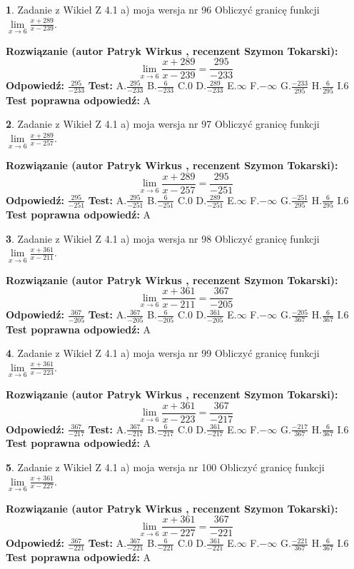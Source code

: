 \documentclass[12pt, a4paper]{article}
\theoremstyle{definition} %
\newtheorem{zad}{}
\newcommand{\zadStart}[1]{\begin{zad}#1\newline}
\newcommand{\zadStop}{\end{zad}}
\newcommand{\rozwStart}[2]{\noindent \textbf{Rozwiązanie (autor #1 , recenzent #2): }\newline}
\newcommand{\rozwStop}{\newline}
\newcommand{\odpStart}{\noindent \textbf{Odpowiedź:}\newline}
\newcommand{\odpStop}{\newline}
\newcommand{\testStart}{\noindent \textbf{Test:}\newline}
\newcommand{\testStop}{\newline}
\newcommand{\kluczStart}{\noindent \textbf{Test poprawna odpowiedź:}\newline}
\newcommand{\kluczStop}{\newline}
\begin{document}
\zadStart{Zadanie z Wikieł Z 4.1 a) moja wersja nr 96}
Obliczyć granicę funkcji $\lim\limits_{x\to6}\frac{x+289}{x-239}$.
\zadStop
\rozwStart{Patryk Wirkus}{Szymon Tokarski}
$$\lim\limits_{x\to6}\frac{x+289}{x-239} = \frac{295}{-233}$$
\rozwStop
\odpStart
$\frac{295}{-233}$
\odpStop
\testStart
A.$\frac{295}{-233}$
B.$\frac{6}{-233}$
C.$0$
D.$\frac{289}{-233}$
E.$\infty$
F.$-\infty$
G.$\frac{-233}{295}$
H.$\frac{6}{295}$
I.$6$
\testStop
\kluczStart
A
\kluczStop



\zadStart{Zadanie z Wikieł Z 4.1 a) moja wersja nr 97}
Obliczyć granicę funkcji $\lim\limits_{x\to6}\frac{x+289}{x-257}$.
\zadStop
\rozwStart{Patryk Wirkus}{Szymon Tokarski}
$$\lim\limits_{x\to6}\frac{x+289}{x-257} = \frac{295}{-251}$$
\rozwStop
\odpStart
$\frac{295}{-251}$
\odpStop
\testStart
A.$\frac{295}{-251}$
B.$\frac{6}{-251}$
C.$0$
D.$\frac{289}{-251}$
E.$\infty$
F.$-\infty$
G.$\frac{-251}{295}$
H.$\frac{6}{295}$
I.$6$
\testStop
\kluczStart
A
\kluczStop



\zadStart{Zadanie z Wikieł Z 4.1 a) moja wersja nr 98}
Obliczyć granicę funkcji $\lim\limits_{x\to6}\frac{x+361}{x-211}$.
\zadStop
\rozwStart{Patryk Wirkus}{Szymon Tokarski}
$$\lim\limits_{x\to6}\frac{x+361}{x-211} = \frac{367}{-205}$$
\rozwStop
\odpStart
$\frac{367}{-205}$
\odpStop
\testStart
A.$\frac{367}{-205}$
B.$\frac{6}{-205}$
C.$0$
D.$\frac{361}{-205}$
E.$\infty$
F.$-\infty$
G.$\frac{-205}{367}$
H.$\frac{6}{367}$
I.$6$
\testStop
\kluczStart
A
\kluczStop



\zadStart{Zadanie z Wikieł Z 4.1 a) moja wersja nr 99}
Obliczyć granicę funkcji $\lim\limits_{x\to6}\frac{x+361}{x-223}$.
\zadStop
\rozwStart{Patryk Wirkus}{Szymon Tokarski}
$$\lim\limits_{x\to6}\frac{x+361}{x-223} = \frac{367}{-217}$$
\rozwStop
\odpStart
$\frac{367}{-217}$
\odpStop
\testStart
A.$\frac{367}{-217}$
B.$\frac{6}{-217}$
C.$0$
D.$\frac{361}{-217}$
E.$\infty$
F.$-\infty$
G.$\frac{-217}{367}$
H.$\frac{6}{367}$
I.$6$
\testStop
\kluczStart
A
\kluczStop



\zadStart{Zadanie z Wikieł Z 4.1 a) moja wersja nr 100}
Obliczyć granicę funkcji $\lim\limits_{x\to6}\frac{x+361}{x-227}$.
\zadStop
\rozwStart{Patryk Wirkus}{Szymon Tokarski}
$$\lim\limits_{x\to6}\frac{x+361}{x-227} = \frac{367}{-221}$$
\rozwStop
\odpStart
$\frac{367}{-221}$
\odpStop
\testStart
A.$\frac{367}{-221}$
B.$\frac{6}{-221}$
C.$0$
D.$\frac{361}{-221}$
E.$\infty$
F.$-\infty$
G.$\frac{-221}{367}$
H.$\frac{6}{367}$
I.$6$
\testStop
\kluczStart
A
\kluczStop
\end{document}
